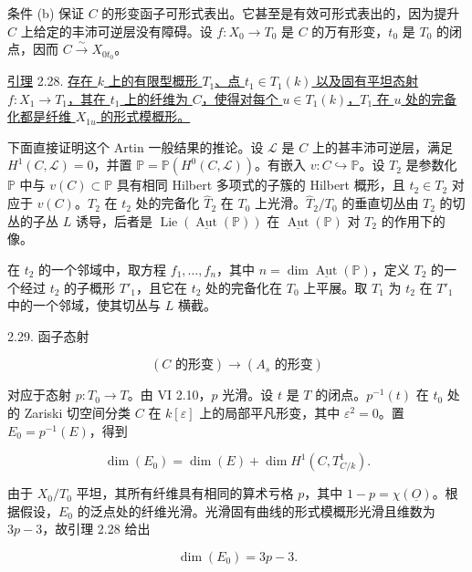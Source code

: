 条件 (b) 保证 $C$ 的形变函子可形式表出。它甚至是有效可形式表出的，因为提升 $C$ 上给定的丰沛可逆层没有障碍。设 $f:X_0\longrightarrow T_0$ 是 $C$ 的万有形变，$t_0$ 是 $T_0$ 的闭点，因而 $C\overset\sim\longrightarrow X_{0t_0}$。

\underline{引理} 2.28. \underline{存在 $k$ 上的有限型概形 $T_1$、点 $t_1\in T_1(k)$ 以及固有平坦态射 $f:X_1\longrightarrow T_1$，其在 $t_1$ 上的纤维为 $C$，使得对每个 $u\in T_1(k)$，$T_1$ 在 $u$ 处的完备化都是纤维 $X_{1u}$ 的形式模概形。}

下面直接证明这个 Artin 一般结果的推论。设 $\mathcal L$ 是 $C$ 上的甚丰沛可逆层，满足 $H^1(C,\mathcal L)=0$，并置 $\mathbb P=\mathbb P(H^0(C,\mathcal L))$。有嵌入 $v:C\hookrightarrow\mathbb P$。设 $T_2$ 是参数化 $\mathbb P$ 中与 $v(C)\subset\mathbb P$ 具有相同 Hilbert 多项式的子簇的 Hilbert 概形，且 $t_2\in T_2$ 对应于 $v(C)$。$T_2$ 在 $t_2$ 处的完备化 $\widehat T_2$ 在 $T_0$ 上光滑。$\widehat T_2/T_0$ 的垂直切丛由 $T_2$ 的切丛的子丛 $L$ 诱导，后者是 $\operatorname{Lie}(\underline{\operatorname{Aut}}(\mathbb P))$ 在 $\underline{\operatorname{Aut}}(\mathbb P)$ 对 $T_2$ 的作用下的像。

在 $t_2$ 的一个邻域中，取方程 $f_1,\ldots,f_n$，其中 $n=\dim\underline{\operatorname{Aut}}(\mathbb P)$，定义 $T_2$ 的一个经过 $t_2$ 的子概形 $T'_1$，且它在 $t_2$ 处的完备化在 $T_0$ 上平展。取 $T_1$ 为 $t_2$ 在 $T'_1$ 中的一个邻域，使其切丛与 $L$ 横截。


2.29. 函子态射

\begin{equation*}
(C\text{ 的形变})\longrightarrow(A_s\text{ 的形变})
\end{equation*}

对应于态射 $p:T_0\longrightarrow T$。由 VI 2.10，$p$ 光滑。设 $t$ 是 $T$ 的闭点。$p^{-1}(t)$ 在 $t_0$ 处的 Zariski 切空间分类 $C$ 在 $k[\varepsilon]$ 上的局部平凡形变，其中 $\varepsilon^2=0$。置 $E_0=p^{-1}(E)$，得到

\begin{equation}\tag{2.29.1}
\dim(E_0)=\dim(E)+\dim H^1(C,T^1_{C/k}).
\end{equation}

由于 $X_0/T_0$ 平坦，其所有纤维具有相同的算术亏格 $p$，其中 $1-p=\chi(\underline O)$。根据假设，$E_0$ 的泛点处的纤维光滑。光滑固有曲线的形式模概形光滑且维数为 $3p-3$，故引理 2.28 给出

\begin{equation}\tag{2.29.2}
\dim(E_0)=3p-3.
\end{equation}

